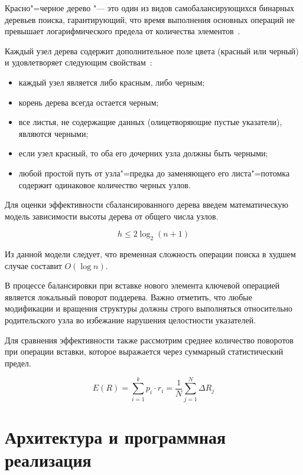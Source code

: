 \documentclass[coursework]{SCWorks}
\begin{document}
Красно"=черное дерево "--- это один из видов самобалансирующихся бинарных деревьев поиска, гарантирующий, что время выполнения основных операций не превышает логарифмического предела от количества элементов~\cite{cormen2013}.

Каждый узел дерева содержит дополнительное поле цвета (красный или черный) и удовлетворяет следующим свойствам~\cite{knuth2007}:

\begin{itemize}
    \item
        каждый узел является либо красным, либо черным;
    \item
        корень дерева всегда остается черным;
    \item
        все листья, не содержащие данных (олицетворяющие пустые указатели), являются черными;
    \item
        если узел красный, то оба его дочерних узла должны быть черными;
    \item
        любой простой путь от узла"=предка до заменяющего его листа"=потомка содержит одинаковое количество черных узлов.
\end{itemize}

Для оценки эффективности сбалансированного дерева введем математическую модель зависимости высоты дерева от общего числа узлов.

\begin{equation}
\label{eq:height_bound}
    h \le 2 \log_2(n+1)
\end{equation}


Из данной модели следует, что временная сложность операции поиска в худшем случае составит $O(\log n)$.\

В процессе балансировки при вставке нового элемента ключевой операцией является локальный поворот поддерева. Важно отметить, что любые модификации и вращения структуры должны строго выполняться относительно родительского узла во избежание нарушения целостности указателей.\

Для сравнения эффективности также рассмотрим среднее количество поворотов при операции вставки, которое выражается через суммарный статистический предел.

\begin{equation}
\label{eq:average_rotations}
    E(R) = \sum_{i=1}^{k} p_i \cdot r_i = \frac{1}{N} \sum_{j=1}^{N} \Delta R_j
\end{equation}


\section{Архитектура и программная реализация}
\end{document}
